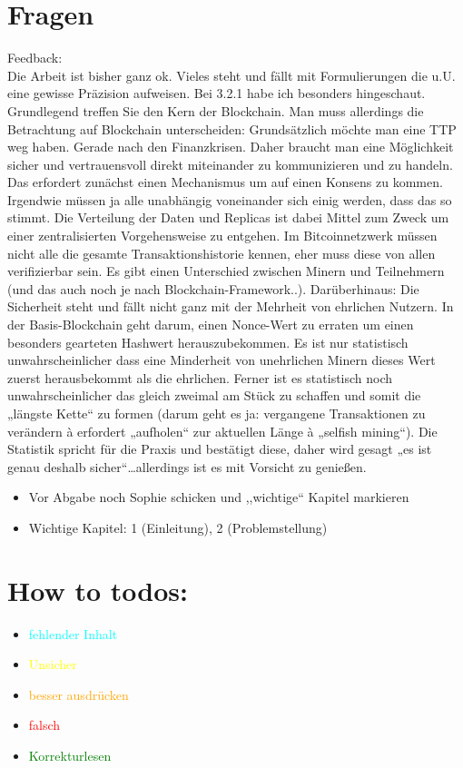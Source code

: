 \section*{Fragen}
    Feedback:\\
    Die Arbeit ist bisher ganz ok. Vieles steht und fällt mit Formulierungen die u.U. eine gewisse Präzision aufweisen.
    Bei 3.2.1 habe ich besonders hingeschaut. Grundlegend treffen Sie den Kern der Blockchain. Man muss allerdings die Betrachtung auf Blockchain unterscheiden:
    Grundsätzlich möchte man eine TTP weg haben. Gerade nach den Finanzkrisen. Daher braucht man eine Möglichkeit sicher und vertrauensvoll direkt miteinander zu kommunizieren und zu handeln.
    Das erfordert zunächst einen Mechanismus um auf einen Konsens zu kommen. Irgendwie müssen ja alle unabhängig voneinander sich einig werden, dass das so stimmt. Die Verteilung der Daten und Replicas ist dabei Mittel zum Zweck um einer zentralisierten Vorgehensweise zu entgehen.
    Im Bitcoinnetzwerk müssen nicht alle die gesamte Transaktionshistorie kennen, eher muss diese von allen verifizierbar sein. Es gibt einen Unterschied zwischen Minern und Teilnehmern (und das auch noch je nach Blockchain-Framework..). Darüberhinaus: Die Sicherheit steht und fällt nicht ganz mit der Mehrheit von ehrlichen Nutzern. In der Basis-Blockchain geht darum, einen Nonce-Wert zu erraten um einen besonders gearteten Hashwert herauszubekommen. Es ist nur statistisch unwahrscheinlicher dass eine Minderheit von unehrlichen Minern dieses Wert zuerst herausbekommt als die ehrlichen. Ferner ist es statistisch noch unwahrscheinlicher das gleich zweimal am Stück zu schaffen und somit die „längste Kette“ zu formen (darum geht es ja: vergangene Transaktionen zu verändern à erfordert „aufholen“ zur aktuellen Länge à „selfish mining“). Die Statistik spricht für die Praxis und bestätigt diese, daher wird gesagt „es ist genau deshalb sicher“…allerdings ist es mit Vorsicht zu genießen.
    
    \begin{itemize}
        \item Vor Abgabe noch Sophie schicken und ,,wichtige`` Kapitel markieren
        \item Wichtige Kapitel: 1 (Einleitung), 2 (Problemstellung)
    \end{itemize}
    
\section*{How to todos:}
    \begin{itemize}
        \item \textcolor{cyan}{fehlender Inhalt}
        \item \textcolor{yellow}{Unsicher}
        \item \textcolor{orange}{besser ausdrücken}
        \item \textcolor{red}{falsch}
        \item \textcolor{green}{Korrekturlesen}
    \end{itemize}
    
